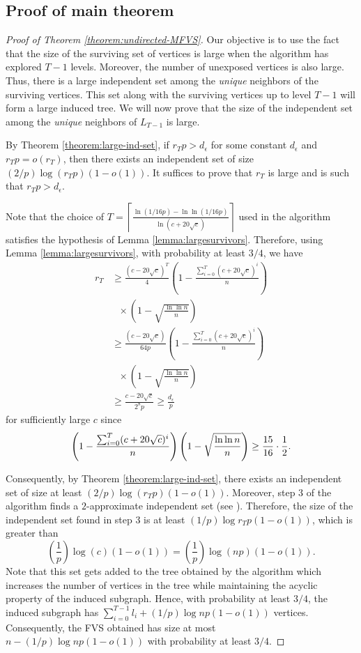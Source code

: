 \documentclass[11pt]{article}
\def\eps{\epsilon}
\begin{document}
\subsection{Proof of main theorem}
\begin{proof} [Proof of Theorem \ref{theorem:undirected-MFVS}]
Our objective is to use the fact that the size of the surviving set of vertices is large when the algorithm has explored $T-1$ levels. Moreover, the number of unexposed vertices is also large. Thus, there is a large independent set among the \emph{unique} neighbors of the surviving vertices. This set along with the surviving vertices up to level $T-1$ will form a large induced tree. We will now prove that the size of the independent set among the \emph{unique} neighbors of $L_{T-1}$ is large.

By Theorem \ref{theorem:large-ind-set}, if $r_{T}p>d_{\eps}$ for some constant $d_{\eps}$ and $r_{T}p=o(r_{T})$, then there exists an independent set of size $(2/p)\log{(r_{T}p)}(1-o(1))$. It suffices to prove that $r_{T}$ is large and is such that $r_Tp>d_{\eps}$.

Note that the choice of $T=\left \lceil \frac{\ln{(1/16p)}-\ln{\ln{(1/16p)}}}{\ln{(c+20\sqrt{c})}}\right \rceil$ used in the algorithm satisfies the hypothesis of Lemma \ref{lemma:largesurvivors}. Therefore, using Lemma \ref{lemma:largesurvivors}, with probability at least $3/4$, we have
\begin{align*}
r_{T}&\geq \frac{(c-20\sqrt{c})^{T}}{4} \left(1-\frac{\sum_{i=0}^{T}(c+20\sqrt{c})^i}{n}\right)\\
 & \ \ \ \times \left(1-\sqrt{\frac{\ln{\ln{n}}}{n}}\right)\\
&\geq \frac{(c-20\sqrt{c})}{64p}\left(1-\frac{\sum_{i=0}^{T}(c+20\sqrt{c})^i}{n}\right)\\
 & \ \ \ \times \left(1-\sqrt{\frac{\ln{\ln{n}}}{n}}\right)\\
&\geq \frac{c-20\sqrt{c}}{2^8p} \geq \frac{d_{\eps}}{p}
\end{align*}
for sufficiently large $c$ since
\[
\left(1-\frac{\sum_{i=0}^{T}(c+20\sqrt{c})^i}{n}\right)\left(1-\sqrt{\frac{\ln{\ln{n}}}{n}}\right)\geq \frac{15}{16}\cdot\frac{1}{2}\\.
\]

Consequently, by Theorem \ref{theorem:large-ind-set}, there exists an independent set of size at least $\left({2}/{p}\right)\log {(r_{T}p)}(1-o(1))$. Moreover, step 3 of the algorithm finds a $2$-approximate independent set (see \cite{grimmett-diarmid-1975,diarmid-1984}). Therefore, the size of the independent set found in step 3 is at least $(1/p)\log{r_Tp}(1-o(1))$, which is greater than
\[
\left(\frac{1}{p}\right)\log {(c)}(1-o(1)) =  \left(\frac{1}{p}\right)\log {(np)}(1-o(1)).
\]
Note that this set gets added to the tree obtained by the algorithm which increases the number of vertices in the tree while maintaining the acyclic property of the induced subgraph. Hence, with probability at least $3/4$, the induced subgraph has $\sum_{i=0}^{T-1}l_{i} + (1/p)\log{np}(1-o(1))$ vertices. Consequently, the FVS obtained has size at most $n-(1/p)\log{np}(1-o(1))$ with probability at least $3/4$.

\end{proof}
\end{document}
